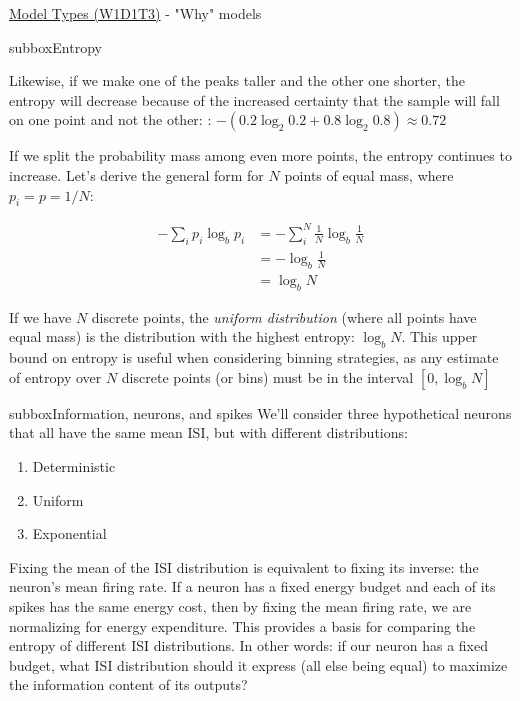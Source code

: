 \begin{textbox}{\href{https://compneuro.neuromatch.io/tutorials/W1D1_ModelTypes/student/W1D1_Tutorial3.html}{Model Types (W1D1T3)} -  "Why" models}


\begin{subbox}{subbox}{Entropy}
\scriptsize


Likewise, if we make one of the peaks taller and the other one shorter, the entropy will decrease because of the increased certainty that the sample will fall on one point and not the other: : $-(0.2 \log_2 0.2 + 0.8\log_2 0.8)\approx 0.72$

If we split the probability mass among even more points, the entropy continues to increase. Let's derive the general form for $N$ points of equal mass, where $p_i=p=1/N$:

\begin{align}
-\sum_i p_i \log_b p_i &= -\sum_i^N \frac{1}{N} \log_b \frac{1}{N} \\
&= -\log_b \frac{1}{N} \\
&= \log_b N
\end{align}

If we have $N$ discrete points, the \textit{uniform distribution} (where all points have equal mass) is the distribution with the highest entropy: $\log_b N$. This upper bound on entropy is useful when considering binning strategies, as any estimate of entropy over $N$ discrete points (or bins) must be in the interval $[0, \log_b N]$

\end{subbox}

\begin{subbox}{subbox}{Information, neurons, and spikes}
\scriptsize
We'll consider three hypothetical neurons that all have the same mean ISI, but with different distributions:
\begin{enumerate}
\item Deterministic
\item Uniform
\item Exponential
\end{enumerate}
Fixing the mean of the ISI distribution is equivalent to fixing its inverse: the neuron's mean firing rate. If a neuron has a fixed energy budget and each of its spikes has the same energy cost, then by fixing the mean firing rate, we are normalizing for energy expenditure. This provides a basis for comparing the entropy of different ISI distributions. In other words: if our neuron has a fixed budget, what ISI distribution should it express (all else being equal) to maximize the information content of its outputs?


\end{subbox}
\end{textbox}

